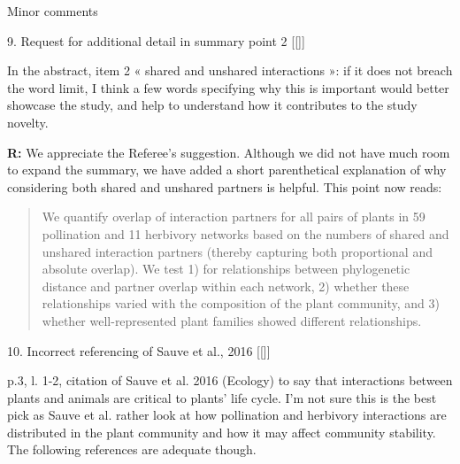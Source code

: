 \documentclass[12pt]{letter}
\newenvironment{refquote}{\bigskip \begin{it}}{\end{it}\smallskip}
\providecommand{\DIFadd}[1]{{\protect\color{blue}\uwave{#1}}} %
\providecommand{\DIFaddbegin}{} %
\providecommand{\DIFaddend}{} %
\providecommand{\DIFdelbegin}{} %
\providecommand{\DIFdelend}{} %
\newcommand{\DIFscaledelfig}{0.5}
\newlength{\DIFdelgraphicswidth} %
\newlength{\DIFdelgraphicsheight} %
\newcommand{\DIFaddincludegraphics}[2][]{{\color{blue}\fbox{\DIFOincludegraphics[#1]{#2}}}} %
\newcommand{\DIFdelincludegraphics}[2][]{%
\sbox{\DIFdelgraphicsbox}{\DIFOincludegraphics[#1]{#2}}%
\settoboxwidth{\DIFdelgraphicswidth}{\DIFdelgraphicsbox} %
\settoboxtotalheight{\DIFdelgraphicsheight}{\DIFdelgraphicsbox} %
\scalebox{\DIFscaledelfig}{%
\parbox[b]{\DIFdelgraphicswidth}{\usebox{\DIFdelgraphicsbox}\\[-\baselineskip] \rule{\DIFdelgraphicswidth}{0em}}\llap{\resizebox{\DIFdelgraphicswidth}{\DIFdelgraphicsheight}{%
\setlength{\unitlength}{\DIFdelgraphicswidth}%
\begin{picture}(1,1)%
\thicklines\linethickness{2pt} %
{\color[rgb]{1,0,0}\put(0,0){\framebox(1,1){}}}%
{\color[rgb]{1,0,0}\put(0,0){\line( 1,1){1}}}%
{\color[rgb]{1,0,0}\put(0,1){\line(1,-1){1}}}%
\end{picture}%
}\hspace*{3pt}}} %
} %
\DeclareRobustCommand{\DIFaddbegin}{\DIFOaddbegin \let\includegraphics\DIFaddincludegraphics} %
\DeclareRobustCommand{\DIFaddend}{\DIFOaddend \let\includegraphics\DIFOincludegraphics} %
\DeclareRobustCommand{\DIFdelbegin}{\DIFOdelbegin \let\includegraphics\DIFdelincludegraphics} %
\DeclareRobustCommand{\DIFdelend}{\DIFOaddend \let\includegraphics\DIFOincludegraphics} %
\begin{document}
\DIFdelbegin %

\DIFdelend Minor comments

9. Request for additional detail in summary point 2 \DIFaddbegin [[\DIFadd{done}]]
\DIFaddend 

	\begin{refquote}
		In the abstract, item 2 « shared and unshared interactions »: if it does not breach the word limit, I think a few words specifying why this is important would better showcase the study, and help to understand how it contributes to the study novelty.
	\end{refquote}

	\textbf{R:} We appreciate the Referee's suggestion. Although we did not have much room to expand the summary, we have added a short parenthetical explanation of why considering both shared and unshared partners is helpful. This point now reads:

	\begin{quotation}

		\DIFdelbegin %
\DIFdelend \item We quantify overlap of interaction partners for all pairs of plants in 59 pollination and 11 herbivory networks based on the numbers of shared and unshared interaction partners (thereby capturing both proportional and absolute overlap). We test 1) for relationships between phylogenetic distance and partner overlap within each network, 2) whether these relationships varied with the composition of the plant community, and 3) whether well-represented plant families showed different relationships. 
\DIFdelbegin %
\DIFdelend 

	\end{quotation}


10. Incorrect referencing of Sauve et al., 2016 \DIFaddbegin [[\DIFadd{done}]]
\DIFaddend 

	\begin{refquote}
		p.3, l. 1-2, citation of Sauve et al. 2016 (Ecology) to say that interactions between plants and animals are critical to plants’ life cycle. I’m not sure this is the best pick as Sauve et al. rather look at how pollination and herbivory interactions are distributed in the plant community and how it may affect community stability. The following references are adequate though.
	\end{refquote}
\end{document}
